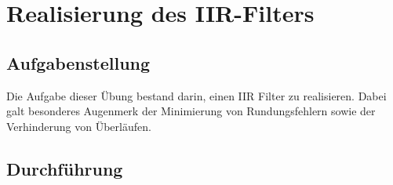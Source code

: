 \chapter{Realisierung des IIR-Filters}\label{Cha:RealIIR}
\section{Aufgabenstellung}
Die Aufgabe dieser Übung bestand darin, einen IIR Filter zu realisieren. Dabei galt besonderes Augenmerk der Minimierung von Rundungsfehlern sowie der Verhinderung von Überläufen.
\section{Durchf\"uhrung}
